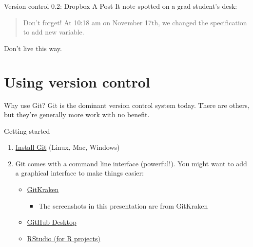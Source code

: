 \documentclass{beamer}
\begin{document}
\begin{frame}{Version control 0.2: Dropbox}
A Post It note spotted on a grad student's desk:
\begin{quote}
	Don't forget! At 10:18 am on November 17th, we changed the specification to add new variable.
\end{quote}
Don't live this way.
\end{frame}

\section{Using version control}

\begin{frame}{Why use Git?}
Git is the dominant version control system today. There are others, but they're generally more work with no benefit.
\end{frame}

\begin{frame}{Getting started}
\begin{enumerate}
\item \href{https://git-scm.com/book/en/v2/Getting-Started-Installing-Git}{Install Git} (Linux, Mac, Windows)
\item Git comes with a command line interface (powerful!). You might want to add a graphical interface to make things easier:
\begin{itemize}
\item \href{https://www.gitkraken.com/}{GitKraken}
\begin{itemize}
\item The screenshots in this presentation are from GitKraken
\end{itemize}
\item \href{https://desktop.github.com/}{GitHub Desktop}
\item \href{https://support.rstudio.com/hc/en-us/articles/200532077-Version-Control-with-Git-and-SVN}{RStudio (for R projects)}
\end{itemize}
\end{enumerate}

\end{frame}
\end{document}
